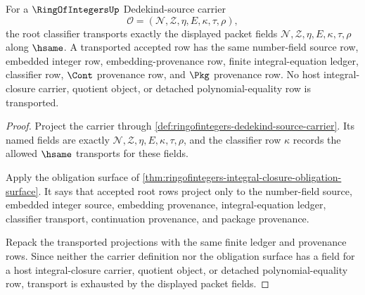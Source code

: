\begin{theorem}
\label{thm:ringofintegers-root-classifier-transport}
For a $\RingOfIntegersUp$ Dedekind-source carrier
$$
\mathcal O=(\mathcal N,\mathcal Z,\eta,E,\kappa,\tau,\rho),
$$
the root classifier transports exactly the displayed packet fields
$\mathcal N,\mathcal Z,\eta,E,\kappa,\tau,\rho$ along $\hsame$. A transported
accepted row has the same number-field source row, embedded integer row,
embedding-provenance row, finite integral-equation ledger, classifier row,
$\Cont$ provenance row, and $\Pkg$ provenance row. No host integral-closure
carrier, quotient object, or detached polynomial-equality row is transported.
\end{theorem}
\begin{proof}
Project the carrier through
\autoref{def:ringofintegers-dedekind-source-carrier}. Its named fields are
exactly $\mathcal N,\mathcal Z,\eta,E,\kappa,\tau,\rho$, and the classifier row
$\kappa$ records the allowed $\hsame$ transports for these fields.

Apply the obligation surface of
\autoref{thm:ringofintegers-integral-closure-obligation-surface}. It says that
accepted root rows project only to the number-field source, embedded integer
source, embedding provenance, integral-equation ledger, classifier transport,
continuation provenance, and package provenance.

Repack the transported projections with the same finite ledger and provenance
rows. Since neither the carrier definition nor the obligation surface has a
field for a host integral-closure carrier, quotient object, or detached
polynomial-equality row, transport is exhausted by the displayed packet
fields.
\end{proof}

